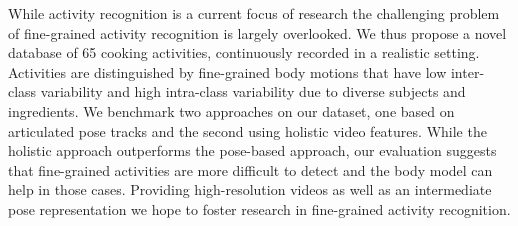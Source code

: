 While activity recognition is a current focus of research the challenging problem of fine-grained activity recognition is largely overlooked. We thus propose a novel database of 65 cooking activities, continuously recorded in a realistic setting. Activities are distinguished by fine-grained body motions that have low inter-class variability and high intra-class variability due to diverse subjects and ingredients.
We benchmark two approaches on our dataset, one based on articulated pose tracks and the second using holistic video features. While the holistic  approach outperforms the pose-based approach, our evaluation suggests that fine-grained activities are more difficult to detect and the body model can help in those cases. 
Providing high-resolution videos as well as an intermediate pose representation we hope to foster research in fine-grained activity recognition.